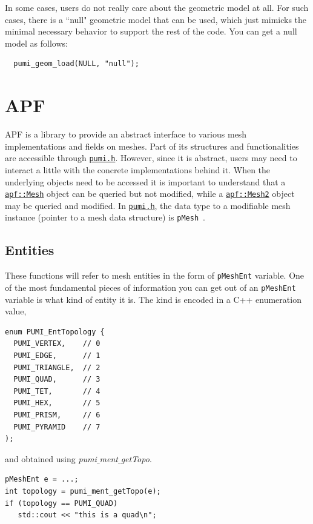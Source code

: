 \documentclass{article}
\begin{document}
In some cases, users do not really care about the geometric model at
all.
For such cases, there is a ``null" geometric model that can be used,
which just mimicks the minimal necessary behavior to support
the rest of the code.
You can get a null model as follows:

\begin{lstlisting}
  pumi_geom_load(NULL, "null");
\end{lstlisting}

\section{APF}

APF is a library to provide an abstract interface to various mesh
implementations and fields on meshes.
Part of its structures and functionalities are accessible through
\href{https://github.com/SCOREC/core/blob/master/pumi/pumi.h}{\texttt{pumi.h}}.
However, since it is abstract, users may need to interact a little with the
concrete implementations behind it.
When the underlying objects need to be accessed it is important to understand
that a
\href{http://scorec.rpi.edu/~dibanez/core/classapf_1_1Mesh.html}{\texttt{apf::Mesh}}
object can be queried but not modified, while a
\href{http://scorec.rpi.edu/~dibanez/core/classapf_1_1Mesh2.html}{\texttt{apf::Mesh2}}
object may be queried and modified.
In \href{https://github.com/SCOREC/core/blob/master/pumi/pumi.h}{\texttt{pumi.h}},
the data type to a modifiable mesh instance (pointer to a mesh data structure)
is \texttt{pMesh}~.

\subsection{Entities}

These functions will refer to mesh entities in the
form of \texttt{pMeshEnt} variable.
One of the most fundamental pieces of information you can get
out of an \texttt{pMeshEnt} variable is what kind of
entity it is.
The kind is encoded in a C++ enumeration value,
\begin{lstlisting}
enum PUMI_EntTopology {
  PUMI_VERTEX,    // 0
  PUMI_EDGE,      // 1
  PUMI_TRIANGLE,  // 2
  PUMI_QUAD,      // 3
  PUMI_TET,       // 4
  PUMI_HEX,       // 5
  PUMI_PRISM,     // 6
  PUMI_PYRAMID    // 7
);
\end{lstlisting}

and obtained using \emph{pumi$\_$ment$\_$getTopo}.

\begin{lstlisting}
pMeshEnt e = ...;
int topology = pumi_ment_getTopo(e);
if (topology == PUMI_QUAD)
   std::cout << "this is a quad\n";
\end{lstlisting}
\end{document}

